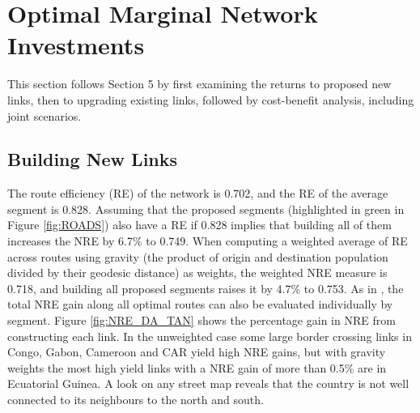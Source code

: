 \documentclass[a4paper]{article}
\begin{document}
\section{Optimal Marginal Network Investments}

This section follows \citet{krantz2024optimal} Section 5 by first examining the returns to proposed new links, then to upgrading existing links, followed by cost-benefit analysis, including joint scenarios. %

\subsection{Building New Links}

The route efficiency (RE) of the network is 0.702, and the RE of the average segment is 0.828. Assuming that the proposed segments (highlighted in green in Figure \ref{fig:ROADS}) also have a RE if 0.828 implies that building all of them increases the NRE by 6.7\% to 0.749. When computing a weighted average of RE across routes using gravity (the product of origin and destination population divided by their geodesic distance) as weights, the weighted NRE measure is 0.718, and building all proposed segments raises it by 4.7\% to 0.753. As in \citet{krantz2024optimal}, the total NRE gain along all optimal routes can also be evaluated individually by segment. Figure \ref{fig:NRE_DA_TAN} shows the percentage gain in NRE from constructing each link. In the unweighted case some large border crossing links in Congo, Gabon, Cameroon and CAR yield high NRE gains, but with gravity weights the most high yield links with a NRE gain of more than 0.5\% are in Ecuatorial Guinea. A look on any street map reveals that the country is not well connected to its neighbours to the north and south.
\end{document}
